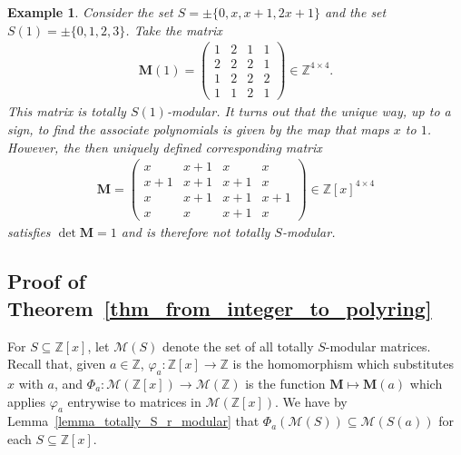 \documentclass[a4paper, 11pt]{article}
\newcommand{\Z}{\mathbb{Z}}
\newcommand{\bM}{\bm{M}}
\newcommand{\indet}{x}
\newcommand{\intvar}{a}
\newcommand{\polyring}{\Z[\indet]}
\newcommand{\polyS}{S}
\newcommand{\polyM}{\bM}
\newtheorem{example}{Example}
\begin{document}
	\begin{example}
		Consider the set $\polyS = \pm\lbrace 0,\indet,\indet + 1,2\indet + 1\rbrace$ and the set $S(1) = \pm \lbrace 0,1,2,3\rbrace$. Take the matrix 
		\begin{align*}
			\polyM(1) = \begin{pmatrix} 1 & 2 & 1 & 1\\ 
				2 & 2 & 2 & 1 \\ 
				1 & 2 & 2 & 2 \\ 
				1 & 1 & 2 & 1 
			\end{pmatrix}\in\Z^{4\times 4}.
		\end{align*}
		This matrix is totally $S(1)$-modular. It turns out that the unique way, up to a sign, to find the associate polynomials is given by the map that maps $\indet$ to $1$. 
		However, the then uniquely defined corresponding matrix
		\begin{align*}
			\polyM = \begin{pmatrix} \indet & \indet+1 & \indet & \indet\\ 
				\indet+1 & \indet+1 & \indet+1 & \indet \\ 
				\indet & \indet+1 & \indet+1 & \indet+1 \\ 
				\indet & \indet & \indet+1 & \indet 
			\end{pmatrix}\in\polyring^{4\times 4} 
		\end{align*}
		satisfies $\det\polyM = 1$ and is therefore not totally $\polyS$-modular.
	\end{example}
	
%	
	
\subsection{Proof of Theorem~\ref{thm_from_integer_to_polyring}}
	For $S\subseteq \polyring$, let $\mathcal{M}(S)$ denote the set of all totally $S$-modular matrices. Recall that, given $\intvar\in\Z$, $\varphi_{\intvar}:\polyring\rightarrow \Z$ is the homomorphism which substitutes $x$ with $\intvar$, and $\Phi_{\intvar}:\mathcal{M}(\polyring)\rightarrow\mathcal{M}(\Z)$ is the function $\polyM\mapsto\polyM(\intvar)$ which applies $\varphi_{\intvar}$ entrywise to matrices in $\mathcal{M}(\polyring)$. We have by Lemma~\ref{lemma_totally_S_r_modular} that $\Phi_{\intvar}(\mathcal{M}(\polyS))\subseteq\mathcal{M}(\polyS(\intvar))$ for each $S\subseteq \polyring$.
	
\end{document}
